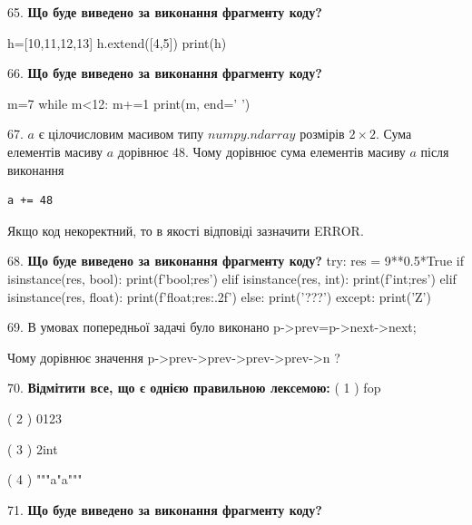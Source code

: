 \documentclass[11pt]{article}
\begin{document}
65. \textbf{Що буде виведено за виконання фрагменту коду?}

h=[10,11,12,13]
h.extend([4,5])
print(h)

\par\vspace{5mm}

66. \textbf{Що буде виведено за виконання фрагменту коду?}

m=7
while m<12:
    m+=1
print(m, end=' ')

\par\vspace{5mm}

67. 
$a$ є цілочисловим масивом типу $numpy.ndarray$ розмірів $2{\times}2$. Сума елементів масиву $a$ дорівнює 48. Чому дорівнює сума елементів масиву $a$ після виконання 
\begin{verbatim}
a += 48
\end{verbatim}


Якщо код некоректний, то в якості відповіді зазначити ERROR.


\par\vspace{5mm}

68. \textbf{Що буде виведено за виконання фрагменту коду?}
try:
    res = 9**0.5*True
    if isinstance(res, bool):
        print(f'bool;{res}')
    elif isinstance(res, int):
        print(f'int;{res}')
    elif isinstance(res, float):
        print(f'float;{res:.2f}')
    else:
        print('???')
except:
    print('Z')
\par\vspace{5mm}

69. 
В умовах попередньої задачі було виконано p->prev=p->next->next;

Чому дорівнює значення p->prev->prev->prev->prev->n ?\par\vspace{5mm}

70. %
\textbf{Відмітити все, що є однією правильною лексемою:}
( 1 ) fop

( 2 ) 0123

( 3 ) 2int

( 4 ) """a"a"""
\par\vspace{5mm}

71. \textbf{Що буде виведено за виконання фрагменту коду?}
\end{document}
